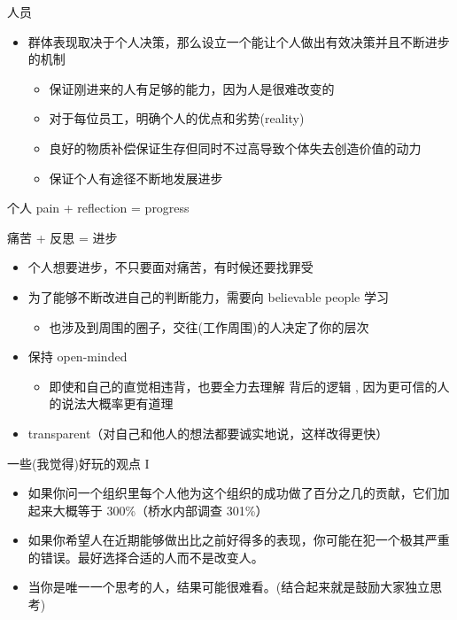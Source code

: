 \documentclass[presentation, bigger]{beamer}
\begin{document}
\begin{frame}[label={sec:org90960b9}]{人员}
\begin{itemize}
\item 群体表现取决于个人决策，那么设立一个能让个人做出有效决策并且不断进步的机制
\begin{itemize}
\item 保证刚进来的人有足够的能力，因为人是很难改变的
\item 对于每位员工，明确个人的优点和劣势(reality)
\item 良好的物质补偿保证生存但同时不过高导致个体失去创造价值的动力
\item 保证个人有途径不断地发展进步
\end{itemize}
\end{itemize}
\end{frame}

\begin{frame}[label={sec:orgf16cf3c}]{个人}
pain + reflection = progress

痛苦 + 反思 = 进步

\begin{itemize}
\item 个人想要进步，不只要面对痛苦，有时候还要找罪受
\item 为了能够不断改进自己的判断能力，需要向 believable people 学习
\begin{itemize}
\item 也涉及到周围的圈子，交往(工作周围)的人决定了你的层次
\end{itemize}
\item 保持 open-minded
\begin{itemize}
\item 即使和自己的直觉相违背，也要全力去理解 \alert{背后的逻辑} , 因为更可信的人的说法大概率更有道理
\end{itemize}
\item transparent（对自己和他人的想法都要诚实地说，这样改得更快）
\end{itemize}
\end{frame}

\begin{frame}[label={sec:orgae054dc}]{一些(我觉得)好玩的观点 I}
\begin{itemize}
\item 如果你问一个组织里每个人他为这个组织的成功做了百分之几的贡献，它们加起来大概等于 300\%（桥水内部调查 301\%）
\item 如果你希望人在近期能够做出比之前好得多的表现，你可能在犯一个极其严重的错误。最好选择合适的人而不是改变人。
\item 当你是唯一一个思考的人，结果可能很难看。(结合起来就是鼓励大家独立思考)
\end{itemize}
\end{frame}
\end{document}

